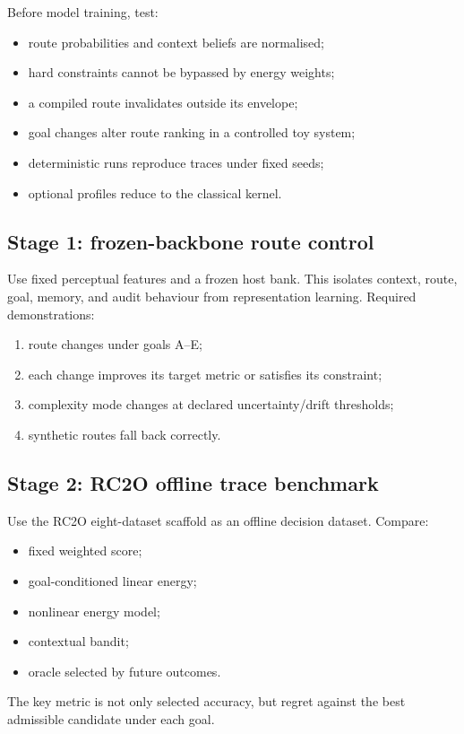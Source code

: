 \documentclass[10pt]{article}
\begin{document}
Before model training, test:
\begin{itemize}
  \item route probabilities and context beliefs are normalised;
  \item hard constraints cannot be bypassed by energy weights;
  \item a compiled route invalidates outside its envelope;
  \item goal changes alter route ranking in a controlled toy system;
  \item deterministic runs reproduce traces under fixed seeds;
  \item optional profiles reduce to the classical kernel.
\end{itemize}

\subsection{Stage 1: frozen-backbone route control}

Use fixed perceptual features and a frozen host bank. This isolates context, route, goal, memory, and audit behaviour from representation learning. Required demonstrations:
\begin{enumerate}
  \item route changes under goals A--E;
  \item each change improves its target metric or satisfies its constraint;
  \item complexity mode changes at declared uncertainty/drift thresholds;
  \item synthetic routes fall back correctly.
\end{enumerate}

\subsection{Stage 2: RC2O offline trace benchmark}

Use the RC2O eight-dataset scaffold as an offline decision dataset. Compare:
\begin{itemize}
  \item fixed weighted score;
  \item goal-conditioned linear energy;
  \item nonlinear energy model;
  \item contextual bandit;
  \item oracle selected by future outcomes.
\end{itemize}
The key metric is not only selected accuracy, but regret against the best admissible candidate under each goal.
\end{document}
